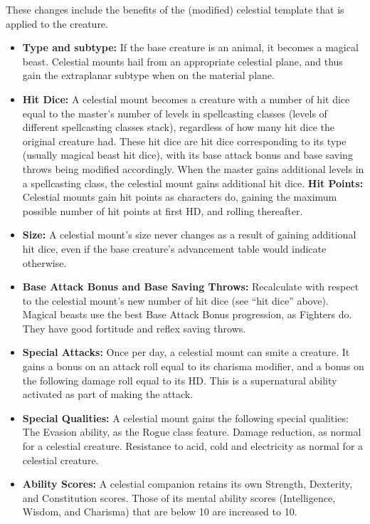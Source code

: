 These changes include the benefits of the (modified) celestial template that is applied to the creature.
\begin{itemize}
 \item \textbf{Type and subtype:} If the base creature is an animal, it becomes a magical beast.
 Celestial mounts hail from an appropriate celestial plane, and thus gain the extraplanar subtype when on the material plane.
 \item \textbf{Hit Dice:} A celestial mount becomes a creature with a number of hit dice equal to the master's number of levels in spellcasting classes 
 (levels of different spellcasting classes stack), 
 regardless of how many hit dice the original creature had. 
 These hit dice are hit dice corresponding to its type (usually magical beast hit dice), with its base attack bonus and base saving throws being modified accordingly.
 When the master gains additional levels in a spellcasting class, the celestial mount gains additional hit dice. 
 \subitem \textbf{Hit Points:} Celestial mounts gain hit points as characters do, gaining the maximum possible number of hit points at first HD, 
 and rolling thereafter.
 \item \textbf{Size:} A celestial mount's size never changes as a result of gaining additional hit dice, even if the base creature's advancement table would indicate otherwise.
 \item \textbf{Base Attack Bonus and Base Saving Throws:} Recalculate with respect to the celestial mount's new number of hit dice (see ``hit dice'' above). 
 Magical beasts use the best Base Attack Bonus progression, as Fighters do. They have good fortitude and reflex saving throws.
 \item \textbf{Special Attacks:} Once per day, a celestial mount can smite a creature.
 It gains a bonus on an attack roll equal to its charisma modifier, and a bonus on the following damage roll equal to its HD.
 This is a supernatural ability activated as part of making the attack.
 \item \textbf{Special Qualities:} A celestial mount gains the following special qualities:
 \subitem The Evasion ability, as the Rogue class feature.
 \subitem Damage reduction, as normal for a celestial creature.
 \subitem Resistance to acid, cold and electricity as normal for a celestial creature.
 \item \textbf{Ability Scores:} A celestial companion retains its own Strength, Dexterity, and Constitution scores. 
 Those of its mental ability scores (Intelligence, Wisdom, and Charisma) that are below 10 are increased to 10.

\end{itemize}
